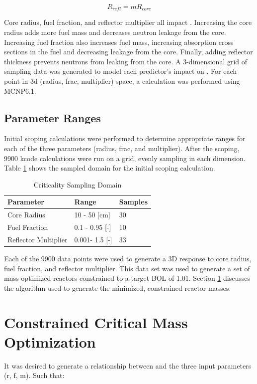 \begin{equation}
    \label{eq:ref_mult}
    R_{refl} = mR_{core}
\end{equation}

Core radius, fuel fraction, and reflector multiplier all impact \keff.
Increasing the core radius adds more fuel mass and decreases neutron leakage 
from the core. Increasing fuel fraction also increases fuel mass, increasing
absorption cross sections in the fuel and decreasing leakage from the core.
Finally, adding reflector thickness prevents neutrons from leaking from the
core. A 3-dimensional grid of sampling data was generated to model each
predictor's impact on \keff. For each
point in 3d (radius, frac, multiplier) space, a \keff calculation was
performed using MCNP6.1.


\subsection{Parameter Ranges}
Initial scoping calculations were performed to determine appropriate ranges for
each of the three parameters (radius, frac, and multiplier). After the scoping,
9900 kcode
calculations were run on a grid, evenly sampling in each dimension.
Table \ref{tab:bol_criticality_1000} shows the sampled domain for the initial
scoping calculation.

\begin{table}[h]
  \centering
  \caption{Criticality Sampling Domain}
  \begin{tabular}{lll}
    \toprule
     Parameter               & Range          & Samples\\ 
    \midrule                                  
     Core Radius             & 10 - 50 [cm]   & 30 \\
     Fuel Fraction 		     & 0.1 - 0.95 [-] & 10 \\
     Reflector Multiplier    & 0.001- 1.5 [-] & 33 \\
  \end{tabular}
  \label{tab:bol_criticality_1000}
\end{table}

Each of the 9900 data points were used to generate a 3D \keff response to
core radius, fuel fraction, and reflector multiplier. This data set was used to
generate a set of mass-optimized reactors constrained to a target BOL \keff of
1.01. Section \ref{sec:crit_rad_search} discusses the algorithm used to generate
the minimized, constrained reactor masses.

\section{Constrained Critical Mass Optimization}\label{sec:crit_rad_search}
It was desired to generate a relationship between \keff and the three input
parameters (r, f, m). Such that:

